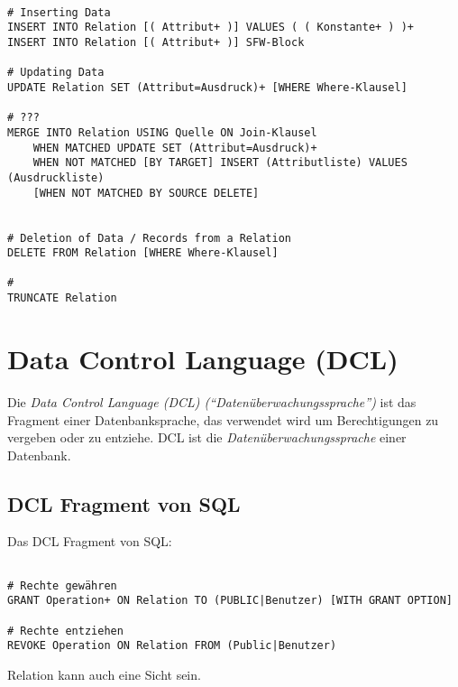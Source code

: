 \documentclass{scrbook}
\begin{document}
\begin{lstlisting}

# Inserting Data
INSERT INTO Relation [( Attribut+ )] VALUES ( ( Konstante+ ) )+
INSERT INTO Relation [( Attribut+ )] SFW-Block

# Updating Data
UPDATE Relation SET (Attribut=Ausdruck)+ [WHERE Where-Klausel]

# ??? 
MERGE INTO Relation USING Quelle ON Join-Klausel
    WHEN MATCHED UPDATE SET (Attribut=Ausdruck)+
    WHEN NOT MATCHED [BY TARGET] INSERT (Attributliste) VALUES (Ausdruckliste)
    [WHEN NOT MATCHED BY SOURCE DELETE]


# Deletion of Data / Records from a Relation
DELETE FROM Relation [WHERE Where-Klausel]

#
TRUNCATE Relation

\end{lstlisting}



\section{Data Control Language (DCL) }

Die \emph{Data Control Language (DCL) (\enquote{Datenüberwachungssprache})}
ist das Fragment einer Datenbanksprache, das verwendet wird um Berechtigungen
zu vergeben oder zu entziehe. DCL ist die \emph{Datenüberwachungssprache}
einer Datenbank.

\subsection{DCL Fragment von SQL}

Das DCL Fragment von SQL:

\begin{lstlisting}

# Rechte gewähren
GRANT Operation+ ON Relation TO (PUBLIC|Benutzer) [WITH GRANT OPTION]

# Rechte entziehen
REVOKE Operation ON Relation FROM (Public|Benutzer)
\end{lstlisting}

Relation kann auch eine Sicht sein.




\end{document}
